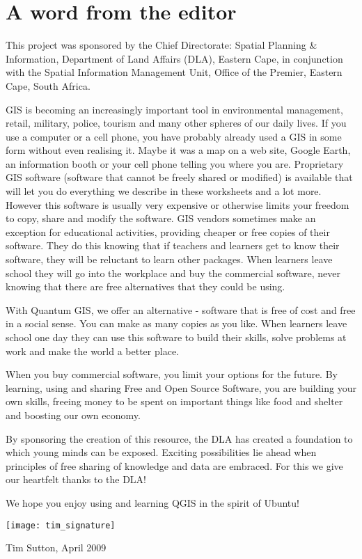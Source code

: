 
\thispagestyle{empty}


\section*{A word from the editor}



This project was sponsored by the Chief Directorate: Spatial Planning \&
Information, Department of Land Affairs (DLA), Eastern Cape, in conjunction
with the Spatial Information Management Unit, Office of the Premier, Eastern
Cape, South Africa.

GIS is becoming an increasingly important tool in environmental management,
retail, military, police, tourism and many other spheres of our daily lives.
If you use a computer or a cell phone, you have probably already used a GIS
in some form without even realising it. Maybe it was a map on a web site,
Google Earth, an information booth or your cell phone telling you where you
are. Proprietary GIS software (software that cannot be freely shared or
modified) is available that will let you do everything we describe in these
worksheets and a lot more. However this software is usually very expensive or
otherwise limits your freedom to copy, share and modify the software. GIS
vendors sometimes make an exception for educational activities, providing
cheaper or free copies of their software. They do this knowing that if
teachers and learners get to know their software, they will be reluctant to
learn other packages. When learners leave school they will go into the
workplace and buy the commercial software, never knowing that there are free
alternatives that they could be using.

With Quantum GIS, we offer an alternative - software that is free of cost and
free in a social sense. You can make as many copies as you like. When learners
leave school one day they can use this software to build their skills, solve
problems at work and make the world a better place.

When you buy commercial software, you limit your options for the future. By
learning, using and sharing Free and Open Source Software, you are building
your own skills, freeing money to be spent on important things like food and
shelter and boosting our own economy.

By sponsoring the creation of this resource, the DLA has created a foundation
to which young minds can be exposed. Exciting possibilities lie ahead when
principles of free sharing of knowledge and data are embraced. For this we
give our heartfelt thanks to the DLA!

We hope you enjoy using and learning QGIS in the spirit of Ubuntu!

\texttt{[image: tim\_signature]}

Tim Sutton, April 2009



